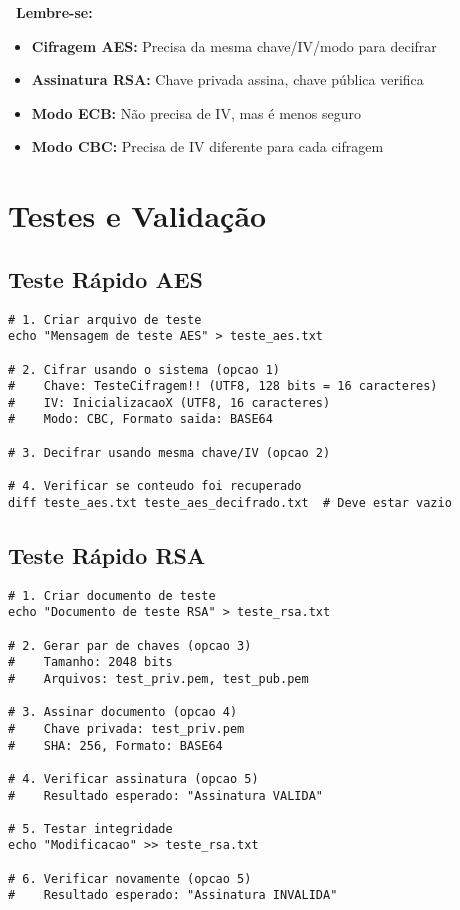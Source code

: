 \documentclass[12pt,a4paper]{article}
\begin{document}
\begin{warningbox}
\textbf{\faExclamationTriangle\ Lembre-se:}
\begin{itemize}
    \item \textbf{Cifragem AES:} Precisa da mesma chave/IV/modo para decifrar
    \item \textbf{Assinatura RSA:} Chave privada assina, chave pública verifica
    \item \textbf{Modo ECB:} Não precisa de IV, mas é menos seguro
    \item \textbf{Modo CBC:} Precisa de IV diferente para cada cifragem
\end{itemize}
\end{warningbox}

\section{Testes e Validação}

\subsection{Teste Rápido AES}

\begin{lstlisting}[style=bashstyle]
# 1. Criar arquivo de teste
echo "Mensagem de teste AES" > teste_aes.txt

# 2. Cifrar usando o sistema (opcao 1)
#    Chave: TesteCifragem!! (UTF8, 128 bits = 16 caracteres)
#    IV: InicializacaoX (UTF8, 16 caracteres)
#    Modo: CBC, Formato saida: BASE64

# 3. Decifrar usando mesma chave/IV (opcao 2)

# 4. Verificar se conteudo foi recuperado
diff teste_aes.txt teste_aes_decifrado.txt  # Deve estar vazio
\end{lstlisting}

\subsection{Teste Rápido RSA}

\begin{lstlisting}[style=bashstyle]
# 1. Criar documento de teste
echo "Documento de teste RSA" > teste_rsa.txt

# 2. Gerar par de chaves (opcao 3)
#    Tamanho: 2048 bits
#    Arquivos: test_priv.pem, test_pub.pem

# 3. Assinar documento (opcao 4)
#    Chave privada: test_priv.pem
#    SHA: 256, Formato: BASE64

# 4. Verificar assinatura (opcao 5)
#    Resultado esperado: "Assinatura VALIDA"

# 5. Testar integridade
echo "Modificacao" >> teste_rsa.txt

# 6. Verificar novamente (opcao 5)
#    Resultado esperado: "Assinatura INVALIDA"
\end{lstlisting}
\end{document}
